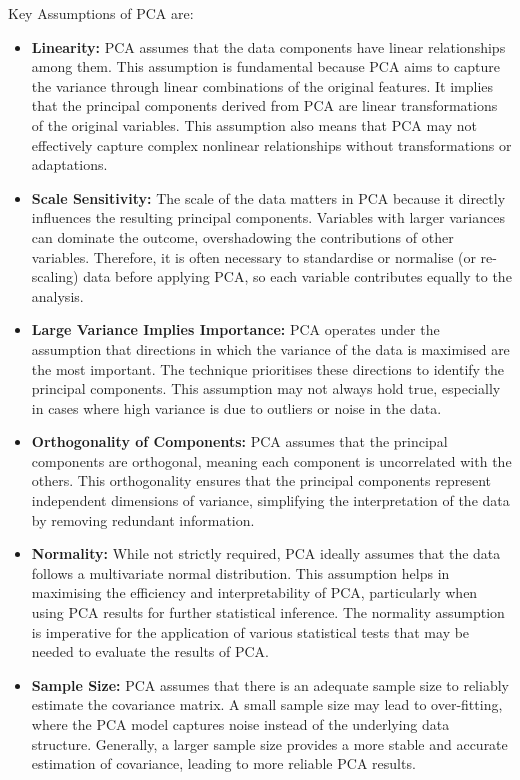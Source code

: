 \documentclass[conference]{IEEEtran}
\begin{document}
Key Assumptions of PCA are:

\begin{itemize}
    \item \textbf{Linearity:} PCA assumes that the data components have linear relationships among them. This assumption is fundamental because PCA aims to capture the variance through linear combinations of the original features. It implies that the principal components derived from PCA are linear transformations of the original variables. This assumption also means that PCA may not effectively capture complex nonlinear relationships without transformations or adaptations.
    
    \item \textbf{Scale Sensitivity:} The scale of the data matters in PCA because it directly influences the resulting principal components. Variables with larger variances can dominate the outcome, overshadowing the contributions of other variables. Therefore, it is often necessary to standardise or normalise (or re-scaling) data before applying PCA, so each variable contributes equally to the analysis.
    
    \item \textbf{Large Variance Implies Importance:} PCA operates under the assumption that directions in which the variance of the data is maximised are the most important. The technique prioritises these directions to identify the principal components. This assumption may not always hold true, especially in cases where high variance is due to outliers or noise in the data.
    
    \item \textbf{Orthogonality of Components:} PCA assumes that the principal components are orthogonal, meaning each component is uncorrelated with the others. This orthogonality ensures that the principal components represent independent dimensions of variance, simplifying the interpretation of the data by removing redundant information.
    
    \item \textbf{Normality:} While not strictly required, PCA ideally assumes that the data follows a multivariate normal distribution. This assumption helps in maximising the efficiency and interpretability of PCA, particularly when using PCA results for further statistical inference. The normality assumption is imperative for the application of various statistical tests that may be needed to evaluate the results of PCA.
    
    \item \textbf{Sample Size:} PCA assumes that there is an adequate sample size to reliably estimate the covariance matrix. A small sample size may lead to over-fitting, where the PCA model captures noise instead of the underlying data structure. Generally, a larger sample size provides a more stable and accurate estimation of covariance, leading to more reliable PCA results.
\end{itemize}
\end{document}
